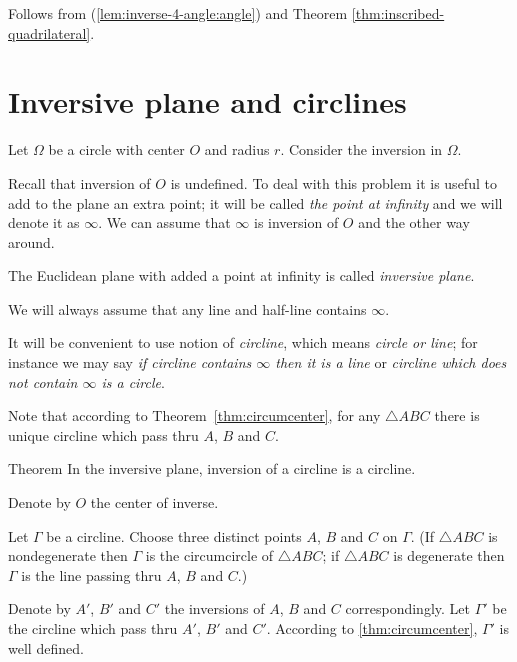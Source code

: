 Follows from (\ref{lem:inverse-4-angle:angle}) and Theorem \ref{thm:inscribed-quadrilateral}.
\qeds

\section*{Inversive plane and circlines}

Let $\Omega$ be a circle with center $O$ and radius $r$.
Consider the inversion in $\Omega$.

Recall that inversion of $O$ is undefined.
To deal with this problem it is useful to add to the plane an extra point;
it will be called \emph{the point at infinity}
and we will denote it as $\infty$.
We can assume that $\infty$ is inversion of $O$ and the other way around.

The Euclidean plane with added a point at infinity is called \emph{inversive plane}.

We will always assume that any line and half-line contains $\infty$. 

It will be convenient to use notion of 
\emph{circline},
which means {}\emph{circle or line};
for instance we may say 
{}\emph{if circline contains $\infty$ then it is a line} or {}\emph{circline which does not contain $\infty$  is a circle}.

Note that according to Theorem~\ref{thm:circumcenter}, 
for any $\triangle ABC$ there is unique circline which pass thru $A$, $B$ and $C$.



\begin{thm}{Theorem}\label{thm:inverse-cline}
In the inversive plane, inversion of a circline is a circline.
\end{thm}

Denote by $O$ the center of inverse.

Let $\Gamma$ be a circline.
Choose three distinct points $A$, $B$ and $C$ on $\Gamma$.
(If $\triangle ABC$ is nondegenerate then $\Gamma$ is the circumcircle of $\triangle ABC$;
if $\triangle ABC$ is degenerate then $\Gamma$ is the line passing thru $A$, $B$ and $C$.)

Denote by $A'$, $B'$ and $C'$ the inversions of $A$, $B$ and $C$ correspondingly.
Let $\Gamma'$ be the circline which pass thru $A'$, $B'$ and $C'$.
According to \ref{thm:circumcenter}, $\Gamma'$ is well defined.

